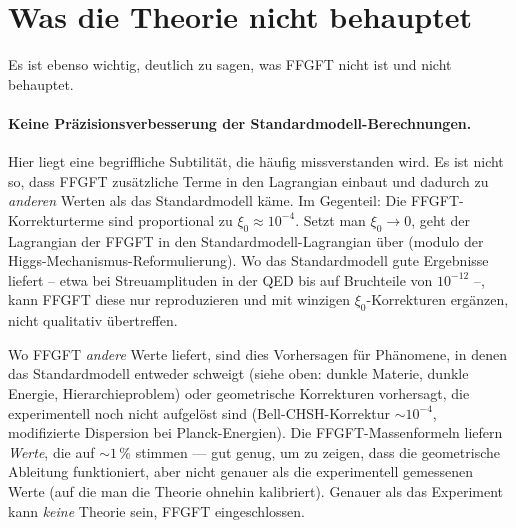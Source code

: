 \section{Was die Theorie nicht behauptet}

Es ist ebenso wichtig, deutlich zu sagen, was FFGFT nicht ist und
nicht behauptet.

\paragraph{Keine Präzisionsverbesserung der Standardmodell-Berechnungen.}
Hier liegt eine begriffliche Subtilität, die häufig
missverstanden wird. Es ist nicht so, dass FFGFT zusätzliche Terme
in den Lagrangian einbaut und dadurch zu \emph{anderen} Werten als
das Standardmodell käme. Im Gegenteil: Die FFGFT-Korrekturterme sind
proportional zu $\xi_0 \approx 10^{-4}$. Setzt man $\xi_0 \to 0$,
geht der Lagrangian der FFGFT in den Standardmodell-Lagrangian über
(modulo der Higgs-Mechanismus-Reformulierung). Wo das Standardmodell
gute Ergebnisse liefert -- etwa bei Streuamplituden in der QED bis
auf Bruchteile von $10^{-12}$ --, kann FFGFT diese nur reproduzieren
und mit winzigen $\xi_0$-Korrekturen ergänzen, nicht qualitativ
übertreffen.

Wo FFGFT \emph{andere} Werte liefert, sind dies Vorhersagen für
Phänomene, in denen das Standardmodell entweder schweigt
(siehe oben: dunkle Materie, dunkle Energie, Hierarchieproblem)
oder geometrische Korrekturen vorhersagt, die experimentell noch
nicht aufgelöst sind (Bell-CHSH-Korrektur $\sim 10^{-4}$, modifizierte
Dispersion bei Planck-Energien). Die FFGFT-Massenformeln liefern
\emph{Werte}, die auf $\sim 1\,\%$ stimmen --- gut genug, um zu
zeigen, dass die geometrische Ableitung funktioniert, aber nicht
genauer als die experimentell gemessenen Werte (auf die man die
Theorie ohnehin kalibriert). Genauer als das Experiment kann
\emph{keine} Theorie sein, FFGFT eingeschlossen.

